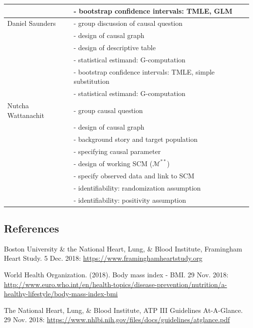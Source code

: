 \documentclass[]{article}
\begin{document}
\begin{table}[h!]
\begin{tabular}{|l|l|}
      & - bootstrap confidence intervals: TMLE, GLM \\ \hline
    Daniel Saunders & - group discussion of causal question \\
      & - design of causal graph \\
      & - design of descriptive table \\
      & - statistical estimand: G-computation \\
      & - bootstrap confidence intervals: TMLE, simple substitution\\ 
      & - statistical estimand: G-computation \\ \hline
    Nutcha Wattanachit & - group causal question \\
      & - design of causal graph \\
      & - background story and target population \\
      & - specifying causal parameter \\
      & - design of working SCM ($\mathcal{M}^{**}$) \\
      & - specify observed data and link to SCM \\
      & - identifiability: randomization assumption \\
      & - identifiability: positivity assumption \\ \hline
  \end{tabular}
\end{table}

\subsection{References}\label{references}

Boston University \& the National Heart, Lung, \& Blood Institute,
Framingham Heart Study. 5 Dec. 2018:
\url{https://www.framinghamheartstudy.org}

World Health Organization. (2018). Body mass index - BMI. 29 Nov. 2018:
\url{http://www.euro.who.int/en/health-topics/disease-prevention/nutrition/a-healthy-lifestyle/body-mass-index-bmi}

The National Heart, Lung, \& Blood Institute, ATP III Guidelines
At-A-Glance. 29 Nov. 2018:
\url{https://www.nhlbi.nih.gov/files/docs/guidelines/atglance.pdf}
\end{document}
